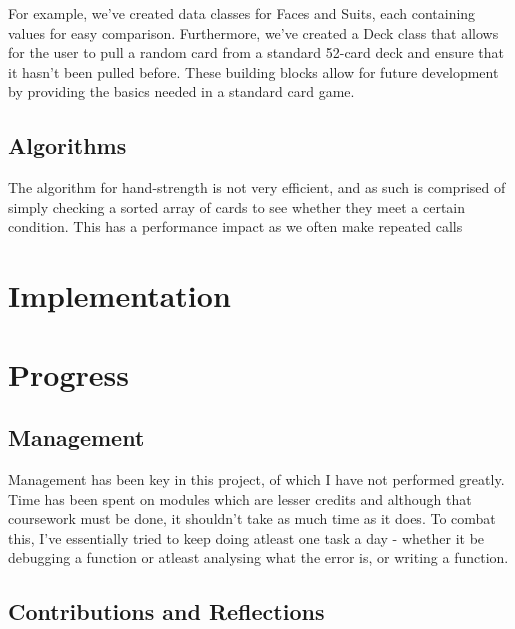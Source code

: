 \documentclass[11pt]{article}
\begin{document}
For example, we've created data classes for Faces and Suits, each containing values for easy comparison. Furthermore, we've created a Deck class that allows for the user to pull a random card from a standard 52-card deck and ensure that it hasn't been pulled before. These building blocks allow for future development by providing the basics needed in a standard card game.


\subsection*{Algorithms}

The algorithm for hand-strength is not very efficient, and as such is comprised of simply checking a sorted array of cards to see whether they meet a certain condition. This has a performance impact as we often make repeated calls 







\section*{Implementation}




\section*{Progress}
\subsection*{Management}

Management has been key in this project, of which I have not performed greatly. Time has been spent on modules which are lesser credits and although that coursework must be done, it shouldn't take as much time as it does. To combat this, I've essentially tried to keep doing atleast one task a day - whether it be debugging a function or atleast analysing what the error is, or writing a function.


\subsection*{Contributions and Reflections}

\newpage
{}
\end{document}
